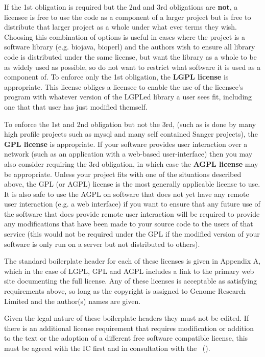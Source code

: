 \documentclass[10pt,a4paper]{article}
\begin{document}
If the 1st obligation is required but the 2nd and 3rd obligations are \textbf{not}, a licensee is free 
to use the code as a component of a larger project but is free to distribute that larger 
project as a whole under what ever terms they wish. Choosing this combination of 
options is useful in cases where the project is a software library (e.g. biojava, bioperl) 
and the authors wish to ensure all library code is distributed under the same license, 
but want the library as a whole to be as widely used as possible, so do not want to 
restrict what software it is used as a component of. To enforce only the 1st obligation, 
the \textbf{LGPL license} is appropriate. This license obliges a licensee to enable the use of the 
licensee's program with whatever version of the LGPLed library a user sees fit, 
including one that that user has just modified themself. 

To enforce the 1st and 2nd obligation but not the 3rd, (such as is done by many high 
profile projects such as mysql and many self contained Sanger projects), the \textbf{GPL 
license} is appropriate. If your software provides user interaction over a network (such 
as an application with a web-based user-interface) then you may also consider requiring 
the 3rd obligation, in which case the \textbf{AGPL license} may be appropriate. Unless your 
project fits with one of the situations described above, the GPL (or AGPL) license is the 
most generally applicable license to use. It is also safe to use the AGPL on software that 
does not yet have any remote user interaction (e.g. a web interface) if you want to 
ensure that any future use of the software that does provide remote user interaction will 
be required to provide any modifications that have been made to your source code to 
the users of that service (this would not be required under the GPL if the modified 
version of your software is only run on a server but not distributed to others). 
 
The standard boilerplate header for each of these licenses is given in Appendix A, 
which in the case of LGPL, GPL and AGPL includes a link to the primary web site 
documenting the full license. Any of these licenses is acceptable as satisfying 
requirements above, so long as the copyright is assigned to Genome Research Limited 
and the author(s) names are given.

Given the legal nature of these boilerplate headers they must not be edited. If there is an 
additional license requirement that requires modification or addition to the text or the 
adoption of a different free software compatible license, this must be agreed with the 
IC first and in consultation with the \exectitle\ (\execperson).
\end{document}
